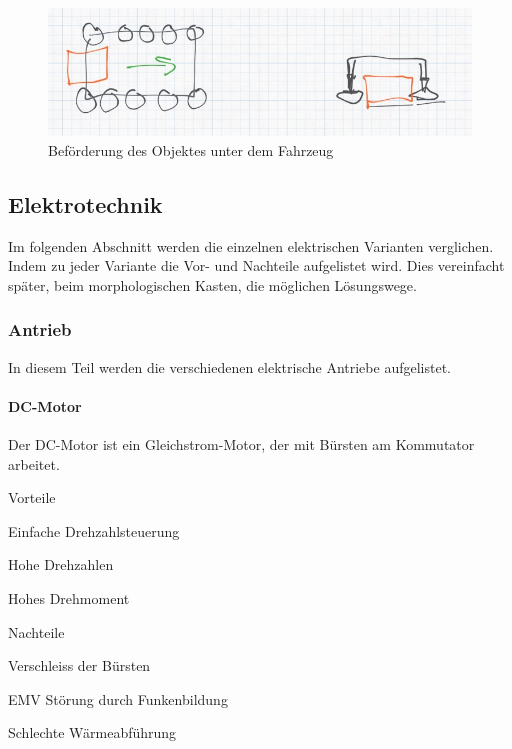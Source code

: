 \begin{figure}[h!]
    \centering
    \begin{minipage}{0.45\textwidth}
        \centering
        \includegraphics[width=\textwidth]{img/technologierecherche/Rotation/waescheanlage.jpg}
        \caption{Beförderung des Objektes unter dem Fahrzeug}
        \label{img:tech_waescheanlage}
    \end{minipage}
    \hfill
\end{figure}





\newpage
\subsection{Elektrotechnik}
Im folgenden Abschnitt werden die einzelnen elektrischen Varianten verglichen. Indem zu jeder Variante die Vor- und Nachteile aufgelistet wird. Dies vereinfacht später, beim morphologischen Kasten, die möglichen Lösungswege.

\subsubsection{Antrieb}

In diesem Teil werden die verschiedenen elektrische Antriebe aufgelistet. 

\paragraph{DC-Motor}

Der DC-Motor ist ein Gleichstrom-Motor, der mit Bürsten am Kommutator arbeitet. 

\begin{minipage}[t]{0.48\textwidth}
\begin{items}
  \item [Vorteile]
  \item Einfache Drehzahlsteuerung
  \item Hohe Drehzahlen
  \item Hohes Drehmoment
\end{items}
\end{minipage}
\hfill
\begin{minipage}[t]{0.48\textwidth}
\begin{items}
  \item [Nachteile]
  \item Verschleiss der Bürsten
  \item EMV Störung durch Funkenbildung
  \item Schlechte Wärmeabführung
\end{items}
\end{minipage}

